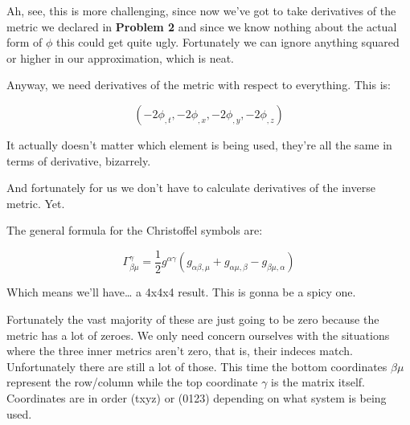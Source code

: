 \documentclass[landscape,letterpaper,10pt,english]{article}
\begin{document}
Ah, see, this is more challenging, since now we've got to take
derivatives of the metric we declared in \textbf{Problem 2} and since we
know nothing about the actual form of \(\phi\) this could get quite
ugly. Fortunately we can ignore anything squared or higher in our
approximation, which is neat.

Anyway, we need derivatives of the metric with respect to everything.
This is:

\[(-2\phi_{,t},-2\phi_{,x},-2\phi_{,y},-2\phi_{,z})\]

It actually doesn't matter which element is being used, they're all the
same in terms of derivative, bizarrely.

And fortunately for us we don't have to calculate derivatives of the
inverse metric. Yet.

The general formula for the Christoffel symbols are:

\[ \Gamma^\gamma_{\beta\mu} = \frac{1}{2} g^{\alpha\gamma} (g_{\alpha\beta,\mu} + g_{\alpha\mu,\beta} - g_{\beta\mu,\alpha})  \]

Which means we'll have\ldots{} a 4x4x4 result. This is gonna be a spicy
one.

    Fortunately the vast majority of these are just going to be zero because
the metric has a lot of zeroes. We only need concern ourselves with the
situations where the three inner metrics aren't zero, that is, their
indeces match. Unfortunately there are still a lot of those. This time
the bottom coordinates \(\beta\mu\) represent the row/column while the
top coordinate \(\gamma\) is the matrix itself. Coordinates are in order
(txyz) or (0123) depending on what system is being used.
\end{document}
